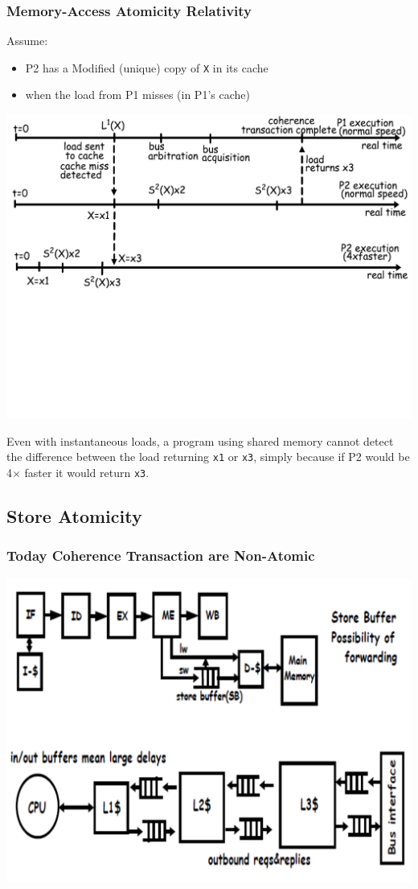 \documentclass{beamer}
\newcommand{\emp}[1]{\textcolor{DikuRed}{ #1}}
\begin{document}
\begin{frame}[fragile,t]
\frametitle{Memory-Access Atomicity Relativity}

Assume:
\begin{itemize}
    \item P2 has a Modified (unique) copy of {\tt X} in its cache
    \item when the load from P1 misses (in P1's cache)
\end{itemize}

{\center \includegraphics[width=59ex]{Ch7Figs/CoherenceEG1}}\pause
\vspace{-18ex}

\emp{Even with instantaneous loads, a program using shared memory 
cannot detect the difference between the load returning {\tt x1} or 
{\tt x3}, simply because if P2 would be 4$\times$ faster it would return {\tt x3}}.

\end{frame}


\subsection{Store Atomicity}

\begin{frame}[fragile,t]
\frametitle{Today Coherence Transaction are Non-Atomic}

{\center \includegraphics[width=59ex]{Ch7Figs/SoteBuffs}}\pause

\end{frame}
\end{document}
